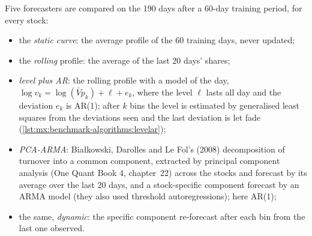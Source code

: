 \begin{omfigure}

\label{fig:mx:benchmark-algorithms:profile}
\end{omfigure}

Five forecasters are compared on the 190 days after a 60-day training period, for every stock:
\begin{itemize}
\item the \emph{static curve}: the average profile of the 60 training days, never updated;
\item the \emph{rolling} profile: the average of the last 20 days' shares;
\item \emph{level plus AR}: the rolling profile with a model of the day, $\log v_k=\log(\bar V p_k)+\ell+e_k$, where the level $\ell$ lasts all day and
the deviation $e_k$ is AR(1); after $k$ bins the level is estimated by generalised least squares from the deviations seen and the last deviation is
let fade (\cref{lst:mx:benchmark-algorithms:levelar});
\item \emph{PCA-ARMA}: Białkowski, Darolles and Le Fol's (2008) decomposition of turnover into a common component, extracted by principal component
analysis (One Quant Book 4, chapter~22) across the stocks and forecast by its average over the last 20 days, and a stock-specific component forecast
by an ARMA model (they also used threshold autoregressions); here AR(1);
\item the same, \emph{dynamic}: the specific component re-forecast after each bin from the last one observed.
\end{itemize}

